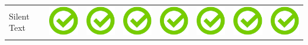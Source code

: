 \documentclass[10pt,foldmark,tumble]{leaflet}
\begin{document}
{\begin{tabular}{ L{2cm} | C{2cm} | C{2cm} | C{2cm} | C{2cm} | C{2cm} | C{2cm} | C{2cm} | }
Silent Text & \includegraphics[scale=0.1]{pics/haken.png} & \includegraphics[scale=0.1]{pics/haken.png} & \includegraphics[scale=0.1]{pics/haken.png} & \includegraphics[scale=0.1]{pics/haken.png} & \includegraphics[scale=0.1]{pics/haken.png} & \includegraphics[scale=0.1]{pics/haken.png} & \includegraphics[scale=0.1]{pics/haken.png} \tabularnewline

\end{tabular}}
\end{document}
